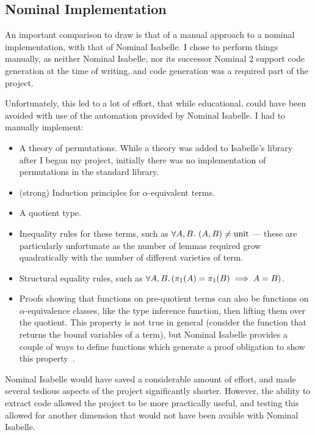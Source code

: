 \subsection{Nominal Implementation}
An important comparison to draw is that of a manual approach to a nominal implementation, with that of Nominal Isabelle.
I chose to perform things manually, as neither Nominal Isabelle, nor its successor Nominal 2 support code generation at the time of writing, and code generation was a required part of the project.

Unfortunately, this led to a lot of effort, that while educational, could have been avoided with use of the automation provided by Nominal Isabelle.
I had to manually implement:
\begin{itemize}
\item
A theory of permutations.
While a theory was added to Isabelle's library after I began my project, initially there was no implementation of permutations in the standard library.
\item
(strong) Induction principles for \(\alpha\)-equivalent terms.
\item
A quotient type.
\item
Inequality rules for these terms, such as \(\forall A, B.\ (A, B) \neq \mathrm{unit}\) --- these are particularly unfortunate as the number of lemmas required grow quadratically with the number of different varieties of term.
\item
Structural equality rules, such as \(\forall A, B.\left(\pi_1(A) = \pi_1(B) \implies A = B\right)\).
\item
Proofs showing that functions on pre-quotient terms can also be functions on \(\alpha\)-equivalence classes, like the type inference function, then lifting them over the quotient.
This property is not true in general (consider the function that returns the bound variables of a term), but Nominal Isabelle provides a couple of ways to define functions which generate a proof obligation to show this property~\cite{fresh-fun}.
\end{itemize}

Nominal Isabelle would have saved a considerable amount of effort, and made several tedious aspects of the project significantly shorter.
However, the ability to extract code allowed the project to be more practically useful, and testing this allowed for another dimension that would not have been avaible with Nominal Isabelle.
